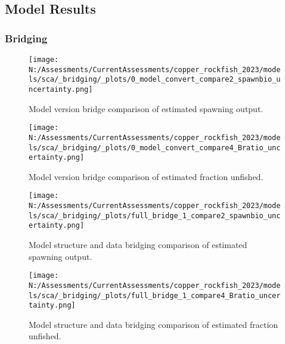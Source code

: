 \documentclass[11pt,
  english,
  letterpaper,
]{article}
\begin{document}
\pagebreak

\hypertarget{model-results}{%
\subsection{Model Results}\label{model-results}}

\hypertarget{bridging}{%
\subsubsection{Bridging}\label{bridging}}

\begin{figure}
\centering
\texttt{[image: N:/Assessments/CurrentAssessments/copper\_rockfish\_2023/models/sca/\_bridging/\_plots/0\_model\_convert\_compare2\_spawnbio\_uncertainty.png]}
\caption{Model version bridge comparison of estimated spawning output.\label{fig:bridge-ssb}}
\end{figure}

\pagebreak

\begin{figure}
\centering
\texttt{[image: N:/Assessments/CurrentAssessments/copper\_rockfish\_2023/models/sca/\_bridging/\_plots/0\_model\_convert\_compare4\_Bratio\_uncertainty.png]}
\caption{Model version bridge comparison of estimated fraction unfished.\label{fig:bridge-depl}}
\end{figure}

\pagebreak

\begin{figure}
\centering
\texttt{[image: N:/Assessments/CurrentAssessments/copper\_rockfish\_2023/models/sca/\_bridging/\_plots/full\_bridge\_1\_compare2\_spawnbio\_uncertainty.png]}
\caption{Model structure and data bridging comparison of estimated spawning output.\label{fig:data-bridge-ssb-1}}
\end{figure}

\pagebreak

\begin{figure}
\centering
\texttt{[image: N:/Assessments/CurrentAssessments/copper\_rockfish\_2023/models/sca/\_bridging/\_plots/full\_bridge\_1\_compare4\_Bratio\_uncertainty.png]}
\caption{Model structure and data bridging comparison of estimated fraction unfished.\label{fig:data-bridge-depl-1}}
\end{figure}

\pagebreak
\end{document}
